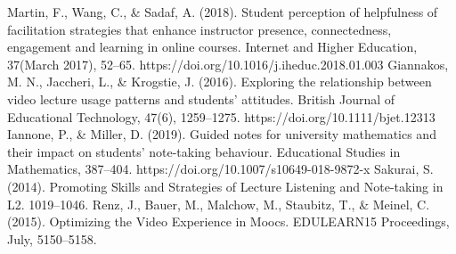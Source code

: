 \documentclass[conference]{IEEEtran}
\begin{document}
\begin{thebibliography}{00}
Martin, F., Wang, C., \& Sadaf, A. (2018). Student perception of helpfulness of facilitation strategies that enhance instructor presence, connectedness, engagement and learning in online courses. Internet and Higher Education, 37(March 2017), 52–65. https://doi.org/10.1016/j.iheduc.2018.01.003
Giannakos, M. N., Jaccheri, L., \& Krogstie, J. (2016). Exploring the relationship between video lecture usage patterns and students’ attitudes. British Journal of Educational Technology, 47(6), 1259–1275. https://doi.org/10.1111/bjet.12313
Iannone, P., \& Miller, D. (2019). Guided notes for university mathematics and their impact on students’ note-taking behaviour. Educational Studies in Mathematics, 387–404. https://doi.org/10.1007/s10649-018-9872-x
Sakurai, S. (2014). Promoting Skills and Strategies of Lecture Listening and Note-taking in L2. 1019–1046.
Renz, J., Bauer, M., Malchow, M., Staubitz, T., \& Meinel, C. (2015). Optimizing the Video Experience in Moocs. EDULEARN15 Proceedings, July, 5150–5158.


\end{thebibliography}
\end{document}

